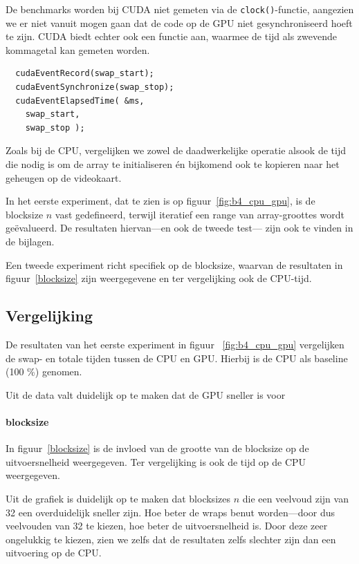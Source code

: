 \documentclass[twocolumn, a4paper]{article}
\begin{document}
De benchmarks worden bij CUDA niet gemeten via de \texttt{clock()}-functie, aangezien we er niet vanuit mogen gaan dat de code op de GPU niet gesynchroniseerd hoeft te zijn. CUDA biedt echter ook een functie aan, waarmee de tijd als zwevende kommagetal kan gemeten worden. 

\begin{verbatim}
  cudaEventRecord(swap_start);
  cudaEventSynchronize(swap_stop);
  cudaEventElapsedTime( &ms, 
    swap_start, 
    swap_stop );
\end{verbatim}
 
Zoals bij de CPU, vergelijken we zowel de daadwerkelijke operatie alsook de tijd die nodig is om de array te initialiseren én bijkomend ook te kopieren naar het geheugen op de videokaart.

In het eerste experiment, dat te zien is op figuur~\ref{fig:b4_cpu_gpu}, is de blocksize $n$ vast gedefineerd, terwijl iteratief een range van array-groottes wordt ge\"evalueerd. De resultaten hiervan---en ook de tweede test--- zijn ook te vinden in de bijlagen.

Een tweede experiment richt specifiek op de blocksize, waarvan de resultaten in figuur~\ref{blocksize} zijn weergegevene en ter vergelijking ook de CPU-tijd. 

\subsection{Vergelijking}
De resultaten van het eerste experiment in figuur ~\ref{fig:b4_cpu_gpu} vergelijken de swap- en totale tijden tussen de CPU en GPU. Hierbij is de CPU als baseline (100 \%) genomen.

Uit de data valt duidelijk op te maken dat de GPU sneller is voor

\paragraph{blocksize}

In figuur~\ref{blocksize} is de invloed van de grootte van de blocksize op de uitvoersnelheid weergegeven. Ter vergelijking is ook de tijd op de CPU weergegeven.

Uit de grafiek is duidelijk op te maken dat blocksizes $n$ die een veelvoud zijn van 32 een overduidelijk sneller zijn. Hoe beter de wraps benut worden---door dus veelvouden van 32 te kiezen, hoe beter de uitvoersnelheid is. Door deze zeer ongelukkig te kiezen, zien we zelfs dat de resultaten zelfs slechter zijn dan een uitvoering op de CPU. 
\end{document}
